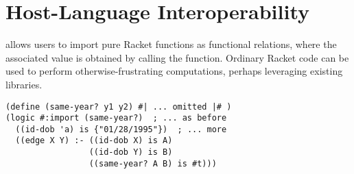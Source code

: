 \documentclass[dvipsnames,sigplan,screen,acmthm,nonacm]{acmart}
\begin{document}
\vspace{-0.25cm}
\begin{figure}[h]
  \begin{center}
  \end{center}
\end{figure}
\vspace{-0.5cm}


\section{Host-Language Interoperability}


\miniDusa{} allows users
to import pure Racket functions as functional relations, where the
associated value is obtained by calling the function. Ordinary Racket code can
be used to perform otherwise-frustrating computations, perhaps leveraging
existing libraries.

\begin{verbatim}
(define (same-year? y1 y2) #| ... omitted |# )
(logic #:import (same-year?)  ; ... as before
  ((id-dob 'a) is {"01/28/1995"})  ; ... more
  ((edge X Y) :- ((id-dob X) is A)
                 ((id-dob Y) is B)
                 ((same-year? A B) is #t)))
\end{verbatim}
\end{document}
